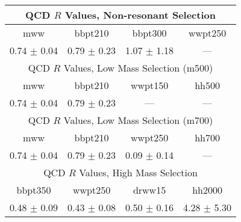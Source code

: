 \begin{tabular}{c|c|c|c}
\hline\hline
\multicolumn{4}{c}{QCD $R$ Values, Non-resonant Selection}\\\hline\hline
mww 	& bbpt210 	& bbpt300 	& wwpt250	\\\hline 
0.74 $\pm$ 0.04 	& 0.79 $\pm$ 0.23 	& 1.07 $\pm$ 1.18 	& ---	\\\hline \hline

\multicolumn{4}{c}{QCD $R$ Values, Low Mass Selection (m500)}\\\hline\hline
mww 	& bbpt210 	& wwpt150 	& hh500	\\\hline 
0.74 $\pm$ 0.04 	& 0.79 $\pm$ 0.23 	& --- 	& ---	\\\hline \hline

\multicolumn{4}{c}{QCD $R$ Values, Low Mass Selection (m700)}\\\hline\hline
mww 	& bbpt210 	& wwpt250 	& hh700	\\\hline 
0.74 $\pm$ 0.04 	& 0.79 $\pm$ 0.23 	& 0.09 $\pm$ 0.14 	& ---	\\\hline \hline

\multicolumn{4}{c}{QCD $R$ Values, High Mass Selection}\\\hline\hline
bbpt350 	& wwpt250 	& drww15 	& hh2000	\\\hline 
0.48 $\pm$ 0.09 	& 0.43 $\pm$ 0.08 	& 0.50 $\pm$ 0.16 	& 4.28 $\pm$ 5.30	\\\hline 
\hline\hline
\end{tabular}

